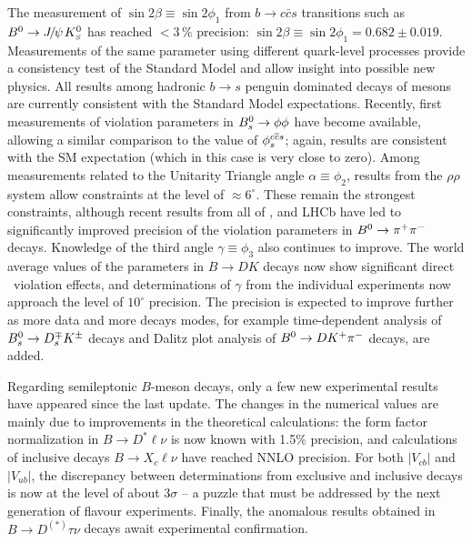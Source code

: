 The measurement of $\sin 2\beta \equiv \sin 2\phi_1$ from $b \to
c\bar{c}s$ transitions such as $B^0 \to {J\mskip -3mu/\mskip -2mu\psi\mskip 2mu}K^0_{\scriptscriptstyle S}$ has reached $<3\,\%$
precision: $\sin 2\beta \equiv \sin 2\phi_1 = 0.682 \pm 0.019$.
Measurements of the same parameter using different quark-level processes
provide a consistency test of the Standard Model and allow insight into
possible new physics.  
All results among hadronic $b \to s$ penguin dominated decays of \Bz mesons are currently consistent with the Standard Model expectations.  
Recently, first measurements of \CP violation parameters in $B^0_s \to \phi\phi$ have become available, allowing a similar comparison to the value of $\phiccbars$; again, results are consistent with the SM expectation (which in this case is very close to zero).
Among measurements related to the Unitarity Triangle angle $\alpha \equiv \phi_2$, results from the $\rho\rho$ system allow constraints at the level of $\approx
6^\circ$.  
These remain the strongest constraints, although recent results from all of \babar, \belle and LHCb have led to significantly improved precision of the \CP violation parameters in $B^0 \to \pi^+\pi^-$ decays.
Knowledge of the third angle $\gamma \equiv \phi_3$ also continues to improve.  
The world average values of the parameters in $B \to DK$ decays now show significant direct \CP\ violation effects, and determinations of $\gamma$ from the individual experiments now approach the level of $10^\circ$ precision.
The precision is expected to improve further as more data and more decays modes, for example time-dependent analysis of $B^0_s \to D_s^{\mp}K^\pm$ decays and Dalitz plot analysis of $B^0 \to DK^+\pi^-$ decays, are added.

Regarding semileptonic $B$-meson decays, only a few new experimental
results have appeared since the last update.
The changes in the numerical values are mainly due to improvements in the theoretical calculations: the form factor normalization in $B\to D^*\ell\nu$ is now known with 1.5\% precision, %
and calculations of inclusive decays $B\to X_c\ell\nu$ have reached NNLO precision. %
For both $|V_{cb}|$ and $|V_{ub}|$, the discrepancy between determinations from exclusive and inclusive decays is now at the level of about 3$\sigma$ -- a puzzle that must be addressed by the next generation of flavour experiments. 
Finally, the anomalous results obtained in $B\to D^{(*)}\tau\nu$ decays %
await experimental confirmation.

